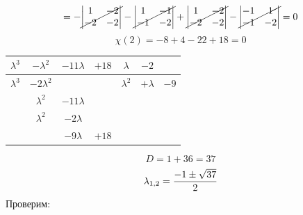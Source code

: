 \begin{multline*}
    = -\cancel{
        \begin{vmatrix}
            1 & -2 \\
            -2 & -2
        \end{vmatrix}} - \cancel{
        \begin{vmatrix}
            1 & -1 \\
            -1 & -2
        \end{vmatrix}} + \cancel{
        \begin{vmatrix}
            1 & -2 \\
            -2 & -2
        \end{vmatrix}} - \cancel{
        \begin{vmatrix}
            -1 & 1 \\
            -1 & -2
        \end{vmatrix}} = 0
\end{multline*}
$$ \chi(2) = -8 + 4 - 22 + 18 = 0 $$
\begin{tabular}{c c c c | c c c}
	$ \lambda^3 $ & $ -\lambda^2 $ & $ -11\lambda $ & $ +18 $ & $ \lambda $ & $ -2 $ \\
    \hline
    $ \lambda^3 $ & $ -2\lambda^2 $ & & & $ \lambda^2 $ & $ +\lambda $ & $ -9 $ \\
    \hline
    & $ \lambda^2 $ & $ -11\lambda $ & \\
    & $ \lambda^2 $ & $ -2\lambda $ & \\
    \hline
    & & $ -9\lambda $ & $ +18 $
\end{tabular}
$$ D = 1 + 36 = 37 $$
$$ \lambda_{1,2} = \half[-1 \pm \sqrt{37}] $$
Проверим:
